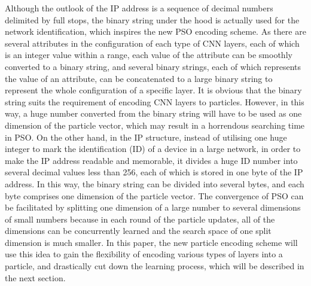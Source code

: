 \documentclass[conference]{IEEEtran}
\begin{document}
Although the outlook of the IP address is a sequence of decimal numbers delimited by full stops, the binary string under the hood is actually used for the network identification, which inspires the new PSO encoding scheme. As there are several attributes in the configuration of each type of CNN layers, each of which is an integer value within a range, each value of the attribute can be smoothly converted to a binary string, and several binary strings, each of which represents the value of an attribute, can be concatenated to a large binary string to represent the whole configuration of a specific layer. It is obvious that the binary string suits the requirement of encoding CNN layers to particles. However, in this way, a huge number converted from the binary string will have to be used as one dimension of the particle vector, which may result in a horrendous searching time in PSO. On the other hand, in the IP structure, instead of utilising one huge integer to mark the identification (ID) of a device in a large network, in order to make the IP address readable and memorable, it divides a huge ID number into several decimal values less than 256, each of which is stored in one byte of the IP address. In this way, the binary string can be divided into several bytes, and each byte comprises one dimension of the particle vector. The convergence of PSO can be facilitated by splitting one dimension of a large number to several dimensions of small numbers because in each round of the particle updates, all of the dimensions can be concurrently learned and the search space of one split dimension is much smaller. In this paper, the new particle encoding scheme will use this idea to gain the flexibility of encoding various types of layers into a particle, and drastically cut down the learning process, which will be described in the next section. 


%
\end{document}
